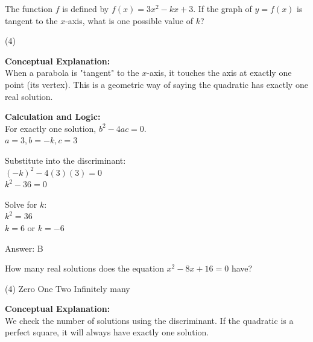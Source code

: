 \documentclass[11pt,paper=a4,answers]{exam}
\begin{document}
\begin{questions}
\vspace{40pt}

\question
The function $f$ is defined by $f(x) = 3x^2 - kx + 3$. If the graph of $y = f(x)$ is tangent to the $x$-axis, what is one possible value of $k$?
\begin{tasks}(4)
\end{tasks}

\begin{solution}
\textbf{Conceptual Explanation:} \\
When a parabola is "tangent" to the $x$-axis, it touches the axis at exactly one point (its vertex). This is a geometric way of saying the quadratic has exactly one real solution.

\vspace{20pt}

\textbf{Calculation and Logic:} \\
For exactly one solution, $b^2 - 4ac = 0$. \\
$a = 3, b = -k, c = 3$

\vspace{10pt}

Substitute into the discriminant: \\
$(-k)^2 - 4(3)(3) = 0$ \\
$k^2 - 36 = 0$

\vspace{10pt}

Solve for $k$: \\
$k^2 = 36$ \\
$k = 6$ or $k = -6$

\vspace{25pt}

Answer: \colorbox{yellow!100}{B}
\end{solution}

\vspace{40pt}

\question
How many real solutions does the equation $x^2 - 8x + 16 = 0$ have?
\begin{tasks}(4)
    \task Zero
    \task One
    \task Two
    \task Infinitely many
\end{tasks}

\begin{solution}
\textbf{Conceptual Explanation:} \\
We check the number of solutions using the discriminant. If the quadratic is a perfect square, it will always have exactly one solution.


\end{solution}
\end{questions}
\end{document}
